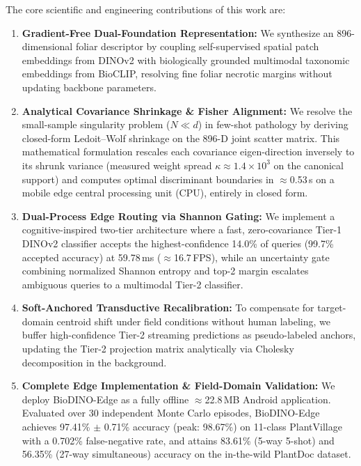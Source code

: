 \documentclass[preprint,12pt]{elsarticle}
\begin{document}
The core scientific and engineering contributions of this work are:
\begin{enumerate}
    \item \textbf{Gradient-Free Dual-Foundation Representation:} We synthesize an 896-dimensional foliar descriptor by coupling self-supervised spatial patch embeddings from DINOv2 with biologically grounded multimodal taxonomic embeddings from BioCLIP, resolving fine foliar necrotic margins without updating backbone parameters.
    \item \textbf{Analytical Covariance Shrinkage \& Fisher Alignment:} We resolve the small-sample singularity problem ($N \ll d$) in few-shot pathology by deriving closed-form Ledoit--Wolf shrinkage on the 896-D joint scatter matrix. This mathematical formulation rescales each covariance eigen-direction inversely to its shrunk variance (measured weight spread $\kappa \approx 1.4\times10^{3}$ on the canonical support) and computes optimal discriminant boundaries in $\approx$0.53\,s on a mobile edge central processing unit (CPU), entirely in closed form.
    \item \textbf{Dual-Process Edge Routing via Shannon Gating:} We implement a cognitive-inspired two-tier architecture where a fast, zero-covariance Tier-1 DINOv2 classifier accepts the highest-confidence 14.0\% of queries (99.7\% accepted accuracy) at 59.78\,ms ($\approx$16.7\,FPS), while an uncertainty gate combining normalized Shannon entropy and top-2 margin escalates ambiguous queries to a multimodal Tier-2 classifier.
    \item \textbf{Soft-Anchored Transductive Recalibration:} To compensate for target-domain centroid shift under field conditions without human labeling, we buffer high-confidence Tier-2 streaming predictions as pseudo-labeled anchors, updating the Tier-2 projection matrix analytically via Cholesky decomposition in the background.
    \item \textbf{Complete Edge Implementation \& Field-Domain Validation:} We deploy BioDINO-Edge as a fully offline $\approx$22.8\,MB Android application. Evaluated over 30 independent Monte Carlo episodes, BioDINO-Edge achieves 97.41\% $\pm$ 0.71\% accuracy (peak: 98.67\%) on 11-class PlantVillage with a 0.702\% false-negative rate, and attains 83.61\% (5-way 5-shot) and 56.35\% (27-way simultaneous) accuracy on the in-the-wild PlantDoc dataset.
\end{enumerate}

\end{document}
